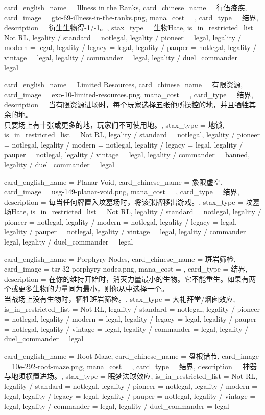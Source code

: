 \documentclass[lang = cn, color = black, 10pt]{AllThatStax}
\begin{document}
\card
{
	card_english_name = {Illness in the Ranks},
	card_chinese_name = {行伍疫疾},
	card_image = gtc-69-illness-in-the-ranks.png,
	mana_cost = ,
	card_type = 结界,
	description = {衍生生物得-1/-1。},
	stax_type = 生物Hate,
	is_in_restricted_list = Not RL,
	legality / standard = notlegal,
	legality / pioneer = legal,
	legality / modern = legal,
	legality / legacy = legal,
	legality / pauper = notlegal,
	legality / vintage = legal,
	legality / commander = legal,
	legality / duel_commander = legal
}

\card
{
	card_english_name = {Limited Resources},
	card_chinese_name = {有限资源},
	card_image = exo-10-limited-resources.png,
	mana_cost = ,
	card_type = 结界,
	description = {当有限资源进场时，每个玩家选择五张他所操控的地，并且牺牲其余的地。\\
只要场上有十张或更多的地，玩家们不可使用地。},
	stax_type = 地锁,
	is_in_restricted_list = Not RL,
	legality / standard = notlegal,
	legality / pioneer = notlegal,
	legality / modern = notlegal,
	legality / legacy = legal,
	legality / pauper = notlegal,
	legality / vintage = legal,
	legality / commander = banned,
	legality / duel_commander = legal
}

\card
{
	card_english_name = {Planar Void},
	card_chinese_name = {象限虚空},
	card_image = usg-149-planar-void.png,
	mana_cost = ,
	card_type = 结界,
	description = {每当任何牌置入坟墓场时，将该张牌移出游戏。},
	stax_type = 坟墓场Hate,
	is_in_restricted_list = Not RL,
	legality / standard = notlegal,
	legality / pioneer = notlegal,
	legality / modern = notlegal,
	legality / legacy = legal,
	legality / pauper = notlegal,
	legality / vintage = legal,
	legality / commander = legal,
	legality / duel_commander = legal
}

\card
{
	card_english_name = {Porphyry Nodes},
	card_chinese_name = {斑岩筛检},
	card_image = tsr-32-porphyry-nodes.png,
	mana_cost = ,
	card_type = 结界,
	description = {在你的维持开始时，消灭力量最小的生物。它不能重生。如果有两个或更多生物的力量同为最小，则你从中选择一个。\\
当战场上没有生物时，牺牲斑岩筛检。},
	stax_type = 大礼拜堂/烟囱效应,
	is_in_restricted_list = Not RL,
	legality / standard = notlegal,
	legality / pioneer = notlegal,
	legality / modern = legal,
	legality / legacy = legal,
	legality / pauper = notlegal,
	legality / vintage = legal,
	legality / commander = legal,
	legality / duel_commander = legal
}

\card
{
	card_english_name = {Root Maze},
	card_chinese_name = {盘根错节},
	card_image = 10e-292-root-maze.png,
	mana_cost = ,
	card_type = 结界,
	description = {神器与地须横置进场。},
	stax_type = 眠梦法球效应,
	is_in_restricted_list = Not RL,
	legality / standard = notlegal,
	legality / pioneer = notlegal,
	legality / modern = legal,
	legality / legacy = legal,
	legality / pauper = notlegal,
	legality / vintage = legal,
	legality / commander = legal,
	legality / duel_commander = legal
}
\end{document}
